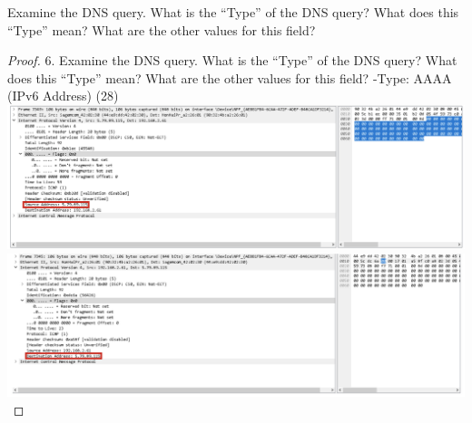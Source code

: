 \documentclass[../../main.tex]{subfiles}
\begin{document}
\begin{wts}
Examine the DNS query. What is the “Type” of the DNS query? What does this “Type” mean? What are the other values for this field?
\end{wts}
\begin{proof}
6. Examine the DNS query. What is the “Type” of the DNS query? What does this “Type” mean? What are the other values for this field?
-Type: AAAA (IPv6 Address) (28)\\

\includegraphics[width=\textwidth]{subfiles/images/PART1_Q8_2.png}
\includegraphics[width=\textwidth]{subfiles/images/PART1_Q8_1.png}
\end{proof}
\end{document}
